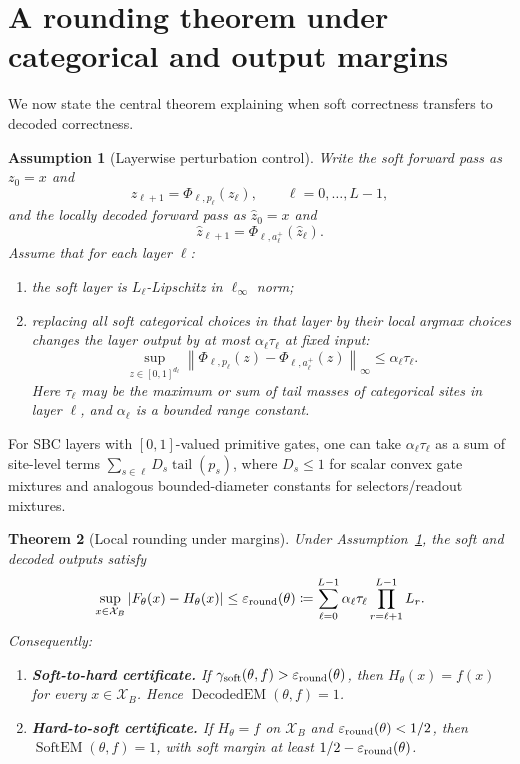 \documentclass[11pt]{article}
\newtheorem{theorem}{Theorem}[section]
\newtheorem{assumption}[theorem]{Assumption}
\theoremstyle{definition}
\theoremstyle{remark}
\newcommand{\X}{\mathcal X}
\newcommand{\tail}{\operatorname{tail}}
\newcommand{\SBC}{\textnormal{\textsc{SBC}}}
\newcommand{\SoftEM}{\operatorname{SoftEM}}
\newcommand{\DecEM}{\operatorname{DecodedEM}}
\newcommand{\errround}{\varepsilon_{\rm round}}
\newcommand{\gammsoft}{\gamma_{\rm soft}}
\newcommand{\norm}[1]{\left\lVert #1\right\rVert}
\begin{document}
\section{A rounding theorem under categorical and output margins}
\label{sec:rounding}

We now state the central theorem explaining when soft correctness transfers to decoded correctness.

\begin{assumption}[Layerwise perturbation control]
\label{ass:layerwise-control}
Write the soft forward pass as $z_0=x$ and
\[
    z_{\ell+1}=\Phi_{\ell,p_\ell}(z_\ell),
    \qquad \ell=0,\ldots,L-1,
\]
and the locally decoded forward pass as $\hat z_0=x$ and
\[
    \hat z_{\ell+1}=\Phi_{\ell,a^+_\ell}(\hat z_\ell).
\]
Assume that for each layer $\ell$:
\begin{enumerate}[leftmargin=1.4em]
\item the soft layer is $L_\ell$-Lipschitz in $\ell_\infty$ norm;
\item replacing all soft categorical choices in that layer by their local argmax choices changes the layer output by at most $\alpha_\ell \tau_\ell$ at fixed input:
\[
    \sup_{z\in[0,1]^{d_\ell}}
    \norm{\Phi_{\ell,p_\ell}(z)-\Phi_{\ell,a^+_\ell}(z)}_\infty
    \le \alpha_\ell\tau_\ell.
\]
Here $\tau_\ell$ may be the maximum or sum of tail masses of categorical sites in layer $\ell$, and $\alpha_\ell$ is a bounded range constant.
\end{enumerate}
\end{assumption}

For \SBC{} layers with $[0,1]$-valued primitive gates, one can take $\alpha_\ell\tau_\ell$ as a sum of site-level terms $\sum_{s\in\ell}D_s\tail(p_s)$, where $D_s\le1$ for scalar convex gate mixtures and analogous bounded-diameter constants for selectors/readout mixtures.

\begin{theorem}[Local rounding under margins]
\label{thm:rounding}
Under Assumption~\ref{ass:layerwise-control}, the soft and decoded outputs satisfy
\[
    \sup_{x\in\X_B}|F_\theta(x)-H_\theta(x)|
    \le
    \errround(\theta)
    \coloneqq
    \sum_{\ell=0}^{L-1}
    \alpha_\ell\tau_\ell
    \prod_{r=\ell+1}^{L-1} L_r.
\]
Consequently:
\begin{enumerate}[leftmargin=1.4em]
\item \textbf{Soft-to-hard certificate.}  If $\gammsoft(\theta,f)>\errround(\theta)$, then $H_\theta(x)=f(x)$ for every $x\in\X_B$.  Hence $\DecEM(\theta,f)=1$.
\item \textbf{Hard-to-soft certificate.}  If $H_\theta=f$ on $\X_B$ and $\errround(\theta)<1/2$, then $\SoftEM(\theta,f)=1$, with soft margin at least $1/2-\errround(\theta)$.
\end{enumerate}
\end{theorem}
\end{document}
